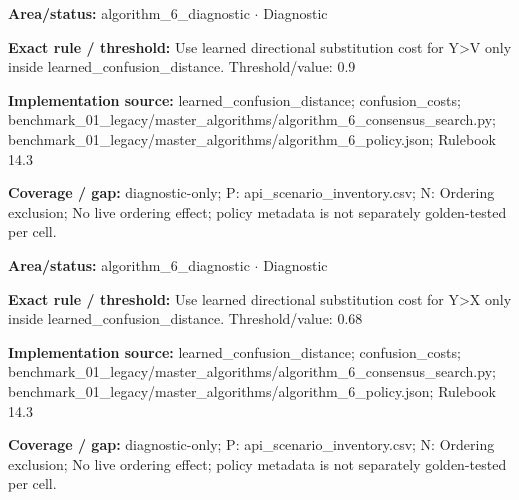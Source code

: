 \begin{tcolorbox}[enhanced,breakable,colback=white,colframe=Muted!45,boxrule=0.45pt,arc=1.5pt,left=6pt,right=6pt,top=5pt,bottom=5pt,title={\texttt{A6-LEARNED-SUBSTITUTION-Y-V}},title after break={\texttt{A6-LEARNED-SUBSTITUTION-Y-V}\ (continued)},fonttitle=\headingfont\bfseries\color{Navy},coltitle=Navy]
\textbf{Area/status:} algorithm\_\allowbreak{}6\_\allowbreak{}diagnostic $\boldsymbol{\cdot}$ Diagnostic\par
\smallskip
\textbf{Exact rule / threshold:} Use learned directional substitution cost for Y>V only inside learned\_\allowbreak{}confusion\_\allowbreak{}distance. Threshold/\allowbreak{}value: 0.9\par
\smallskip
\textbf{Implementation source:} learned\_\allowbreak{}confusion\_\allowbreak{}distance; confusion\_\allowbreak{}costs; benchmark\_\allowbreak{}01\_\allowbreak{}legacy/\allowbreak{}master\_\allowbreak{}algorithms/\allowbreak{}algorithm\_\allowbreak{}6\_\allowbreak{}consensus\_\allowbreak{}search.py; benchmark\_\allowbreak{}01\_\allowbreak{}legacy/\allowbreak{}master\_\allowbreak{}algorithms/\allowbreak{}algorithm\_\allowbreak{}6\_\allowbreak{}policy.json; Rulebook 14.3\par
\smallskip
\textbf{Coverage / gap:} diagnostic-only; P: api\_\allowbreak{}scenario\_\allowbreak{}inventory.csv; N: Ordering exclusion; No live ordering effect; policy metadata is not separately golden-tested per cell.
\end{tcolorbox}
\begin{tcolorbox}[enhanced,breakable,colback=white,colframe=Muted!45,boxrule=0.45pt,arc=1.5pt,left=6pt,right=6pt,top=5pt,bottom=5pt,title={\texttt{A6-LEARNED-SUBSTITUTION-Y-X}},title after break={\texttt{A6-LEARNED-SUBSTITUTION-Y-X}\ (continued)},fonttitle=\headingfont\bfseries\color{Navy},coltitle=Navy]
\textbf{Area/status:} algorithm\_\allowbreak{}6\_\allowbreak{}diagnostic $\boldsymbol{\cdot}$ Diagnostic\par
\smallskip
\textbf{Exact rule / threshold:} Use learned directional substitution cost for Y>X only inside learned\_\allowbreak{}confusion\_\allowbreak{}distance. Threshold/\allowbreak{}value: 0.68\par
\smallskip
\textbf{Implementation source:} learned\_\allowbreak{}confusion\_\allowbreak{}distance; confusion\_\allowbreak{}costs; benchmark\_\allowbreak{}01\_\allowbreak{}legacy/\allowbreak{}master\_\allowbreak{}algorithms/\allowbreak{}algorithm\_\allowbreak{}6\_\allowbreak{}consensus\_\allowbreak{}search.py; benchmark\_\allowbreak{}01\_\allowbreak{}legacy/\allowbreak{}master\_\allowbreak{}algorithms/\allowbreak{}algorithm\_\allowbreak{}6\_\allowbreak{}policy.json; Rulebook 14.3\par
\smallskip
\textbf{Coverage / gap:} diagnostic-only; P: api\_\allowbreak{}scenario\_\allowbreak{}inventory.csv; N: Ordering exclusion; No live ordering effect; policy metadata is not separately golden-tested per cell.
\end{tcolorbox}
